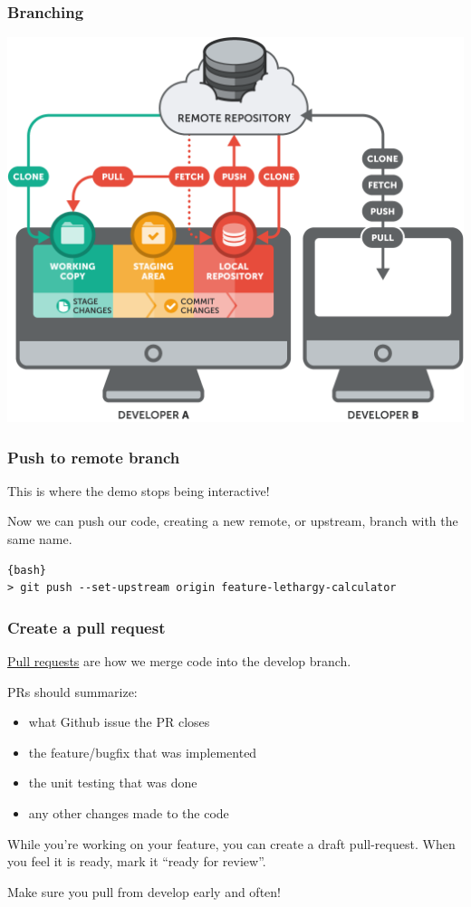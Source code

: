 \documentclass{beamer}
\begin{document}
\begin{frame}
\frametitle{Branching}
\centering
\includegraphics[scale=0.24]{../resources/rem_local.png}

\end{frame}

\begin{frame}[fragile]
\frametitle{Push to remote branch}


This is where the demo stops being interactive!

\vspace{0.5cm}

\normalsize{Now we can push our code, creating a new remote, or upstream, 
branch with the same name.}

\scriptsize{
\begin{lstlisting}{bash}
> git push --set-upstream origin feature-lethargy-calculator
\end{lstlisting}
}

\end{frame}

\begin{frame}
\frametitle{Create a pull request}

\href{https://github.com/umcpt/mc-hammer-2/pulls}{Pull requests} are how we merge code into the develop branch.

PRs should summarize:
\begin{itemize}
  \item what Github issue the PR closes
  \item the feature/bugfix that was implemented
  \item the unit testing that was done
  \item any other changes made to the code
\end{itemize}

While you're working on your feature, you can create a draft pull-request. When you feel it is ready, mark it ``ready for review''.

Make sure you pull from develop early and often!

\end{frame}
\end{document}
